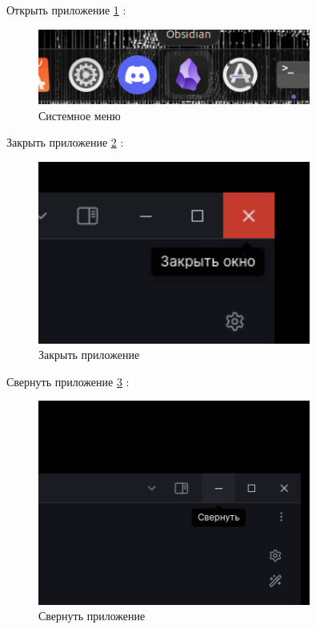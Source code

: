 Открыть приложение \ref{fig:openAppDesktop} :

\begin{figure}[!h]
    \centering
    \includegraphics[width = 0.8\textwidth]{images/openAppDesktop.png}
    
    \caption{Системное меню}
    
    \label{fig:openAppDesktop}
\end{figure}

\newpage

Закрыть приложение \ref{fig:closeAppDesktop} :

\begin{figure}[!h]
    \centering
    \includegraphics[width = 0.8\textwidth]{images/closeAppDesktop.png}
    
    \caption{Закрыть приложение}
    
    \label{fig:closeAppDesktop}
\end{figure}

Свернуть приложение \ref{fig:roll} :

\begin{figure}[!h]
    \centering
    \includegraphics[width = 0.8\textwidth]{images/roll.png}
    
    \caption{Свернуть приложение}
    
    \label{fig:roll}
\end{figure}


